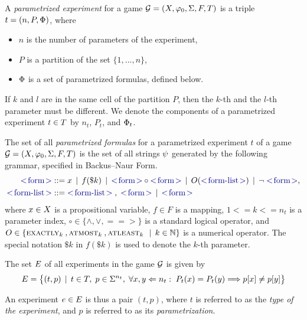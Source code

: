 \begin{definition} \label{def:exp}
A \emph{parametrized experiment} for a game
  $\mathcal{G} = (X, \varphi_0, \Sigma, F, T)$
  is a triple
  $t = (n, P, \Phi)$, where
  \begin{itemize}
  \item $n$ is the number of parameters of the experiment,
  \item $P$ is a partition of the set $\{1, ..., n\}$,
  \item $\Phi$ is a set of parametrized formulas, defined below.
  \end{itemize}
If $k$ and $l$ are in the same cell of the partition $P$, then the $k$-th and
the $l$-th parameter must be different.
We denote the components of a parametrized experiment $t\in T$
  by $n_t$, $P_t$, and $\Phi_t$.
\end{definition}

\begin{definition} \label{def-pform}
The set of all \emph{parametrized formulas} for a parametrized experiment
$t$ of a game $\mathcal{G} = (X, \varphi_0, \Sigma, F, T)$
  is the set of
  all strings $\psi$ generated by the following grammar, specified in Backus–Naur Form.
\begin{align*}
\msymb{form} &::= x \| f(\$k) \| \msymb{form} \circ \msymb{form} \| O(\msymb{form-list})  \| \neg\; \msymb{form},\\
\msymb{form-list} &::= \msymb{form-list} \;,\; \msymb{form} \| \msymb{form}
\end{align*}
  where $x\in X$ is a propositional variable, $f\in F$ is a mapping, $1<= k <= n_t$ is a parameter index,
  $\circ\in\{\wedge, \vee, ==>\}$ is a standard logical operator,
  and $O\in\{ \textsc{exactly}_{k}\:, \textsc{atmost}_{k}\:, \textsc{atleast}_{k}\: \:\:|\:\: k\in\mathbb{N}\}$ is
  a numerical operator.
The special notation $\$k$ in $f(\$k)$ is used to denote the $k$-th parameter.
\end{definition}

The set $E$ of all experiments in the game $\mathcal{G}$ is given by
\[
  E =
     \big\{ (t, p) \:\:|\:\: t\in T,\; p \in\Sigma^{n_t},\;
     \forall x,y<={n_t}:\; P_t(x)=P_t(y) ==> p[x] \not= p[y] \big\}
\]

An experiment $e\in E$ is thus a pair $(t, p)$, where
  $t$ is referred to as the \emph{type of the experiment},
 and $p$ is referred to as its \emph{parametrization}.

